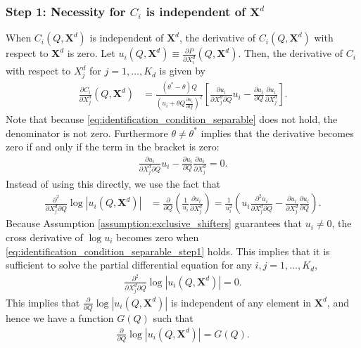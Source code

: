 \documentclass[11pt, a4paper]{article}
\begin{document}
\subsubsection*{Step 1: Necessity for $C_i$ is independent of $\bm{X}^{d}$}
When $C_i(Q, \bm{X}^{d})$ is independent of $\bm{X}^{d}$, the derivative of $C_i(Q, \bm{X}^{d})$ with respect to $\bm{X}^{d}$ is zero.
Let $u_i(Q, \bm{X}^{d}) \equiv \frac{\partial P}{\partial X^{d}_i}(Q, \bm{X}^{d})$.
Then, the derivative of $C_i$ with respect to $X^{d}_j$ for $j = 1, \ldots, K_d$ is given by
\begin{align}
    \frac{\partial C_i}{\partial X^{d}_j}(Q, \bm{X}^{d}) & = \frac{(\theta^{*} - \theta)Q }{\left(u_i + \theta Q \frac{\partial u_i}{\partial Q}\right)^2}\left[\frac{\partial u_i}{\partial X^{d}_j\partial Q} u_i - \frac{\partial u_i}{\partial Q} \frac{\partial u_i}{\partial X^{d}_j}\right].
\end{align}
Note that because \eqref{eq:identification_condition_separable} does not hold, the denominator is not zero.
Furthermore $\theta \ne \theta^{*}$ implies that the derivative becomes zero if and only if the term in the bracket is zero:
\begin{align}
    \frac{\partial u_i}{\partial X^{d}_j\partial Q} u_i - \frac{\partial u_i}{\partial Q} \frac{\partial u_i}{\partial X^{d}_j} = 0. \label{eq:identification_condition_separable_step1}
\end{align}
Instead of using this directly, we use the fact that
\begin{align}
    \frac{\partial^2 }{\partial X^{d}_j \partial Q}\log |u_i(Q, \bm{X}^{d})| & = \frac{\partial }{\partial Q}\left(\frac{1}{u_i}\frac{\partial u_i}{\partial X^{d}_j}\right) = \frac{1}{u_i^2}\left(u_i\frac{\partial^2 u_i}{\partial X^{d}_j \partial Q} - \frac{\partial u_i}{\partial X^{d}_j}\frac{\partial u_i}{\partial Q}\right).
\end{align}
Because Assumption \ref{assumption:exclusive_shifters} guarantees that $u_i \ne 0$, 
the cross derivative of $\log u_i$ becomes zero when \eqref{eq:identification_condition_separable_step1} holds.
This implies that it is sufficient to solve the partial differential equation for any $i,j = 1, \ldots, K_d$,
\begin{align}
    \frac{\partial^2 }{\partial X^{d}_j \partial Q}\log |u_i(Q,\bm{X}^{d})| = 0.
\end{align}
This implies that $\frac{\partial }{\partial Q}\log |u_i(Q, \bm{X}^{d})|$ is independent of any element in $\bm{X}^{d}$, and hence we have a function $G(Q)$ such that
\begin{align}
    \frac{\partial }{\partial Q}\log |u_i(Q, \bm{X}^{d})| = G(Q).
\end{align}
\end{document}
